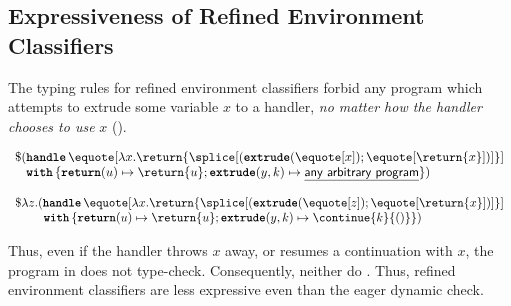 \subsection{Expressiveness of Refined Environment Classifiers}\label{subsection:rec-formal-expressiveness}
The typing rules for refined environment classifiers forbid any program which attempts to extrude some variable $x$ to a handler, \textit{no matter how the handler chooses to use} $x$ ().

\begin{code}
\begin{source}
$\begin{array}{l}
  \$ (\textbf{\texttt{handle}} \, \equote[{\lambda x. \return{\splice[({{\textbf{\texttt{extrude}}(\equote[x])}; \equote[\return{x}]})]}}] \\
  \;\;\,\, \textbf{\texttt{with}} \, \{ \textbf{\texttt{return}}(u) \mapsto {\return{u}}; \textbf{\texttt{extrude}}(y, k) \mapsto {\underline{\textsf{any arbitrary program}}}\})
\end{array}$
\end{source}
%
\label{listing:refined-environment-classifiers-expressiveness}
\end{code}


\begin{code}
\begin{source}
$\begin{array}{l}
  \$ \lambda z. (\textbf{\texttt{handle}} \, \equote[{\lambda x. \return{\splice[({{\textbf{\texttt{extrude}}(\equote[z])}; \equote[\return{x}]})]}}] \\
  \quad \quad \,\, \textbf{\texttt{with}} \, \{ \textbf{\texttt{return}}(u) \mapsto {\return{u}}; \textbf{\texttt{extrude}}(y, k) \mapsto {\continue{k}{()}}\})
\end{array}$
\end{source}
%
\label{listing:refined-environment-classifiers-safe}
\end{code}

Thus, even if the handler throws $x$ away, or resumes a continuation with $x$, the program in  does not type-check. Consequently, neither do . Thus, refined environment classifiers are less expressive even than the eager dynamic check. 


